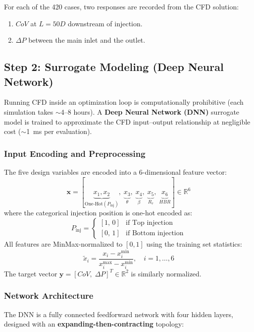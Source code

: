 \documentclass[12pt, a4paper]{report}
\begin{document}
\noindent For each of the 420 cases, two responses are recorded from the CFD solution:
\begin{enumerate}
    \item $CoV$ at $L = 50D$ downstream of injection.
    \item $\Delta P$ between the main inlet and the outlet.
\end{enumerate}

\subsection{Step 2: Surrogate Modeling (Deep Neural Network)}
Running CFD inside an optimization loop is computationally prohibitive (each simulation takes $\sim$4--8 hours). A \textbf{Deep Neural Network (DNN)} surrogate model is trained to approximate the CFD input--output relationship at negligible cost ($\sim$1~ms per evaluation).

\subsubsection{Input Encoding and Preprocessing}
The five design variables are encoded into a 6-dimensional feature vector:
\begin{equation}
    \mathbf{x} = [\underbrace{x_1, x_2}_{\text{One-Hot}(P_{\text{inj}})},\; \underbrace{x_3}_{\theta},\; \underbrace{x_4}_{\beta},\; \underbrace{x_5}_{R_v},\; \underbrace{x_6}_{HBR}] \in \mathbb{R}^{6}
\end{equation}
where the categorical injection position is one-hot encoded as:
\begin{equation}
    P_{\text{inj}} = \begin{cases}
        [1,\, 0] & \text{if Top injection} \\
        [0,\, 1] & \text{if Bottom injection}
    \end{cases}
\end{equation}
All features are MinMax-normalized to $[0, 1]$ using the training set statistics:
\begin{equation}
    \tilde{x}_i = \frac{x_i - x_i^{\min}}{x_i^{\max} - x_i^{\min}}, \quad i = 1, \ldots, 6
\end{equation}
The target vector $\mathbf{y} = [CoV,\; \Delta P]^T \in \mathbb{R}^{2}$ is similarly normalized.

\subsubsection{Network Architecture}
The DNN is a fully connected feedforward network with four hidden layers, designed with an \textbf{expanding-then-contracting} topology:
\end{document}
